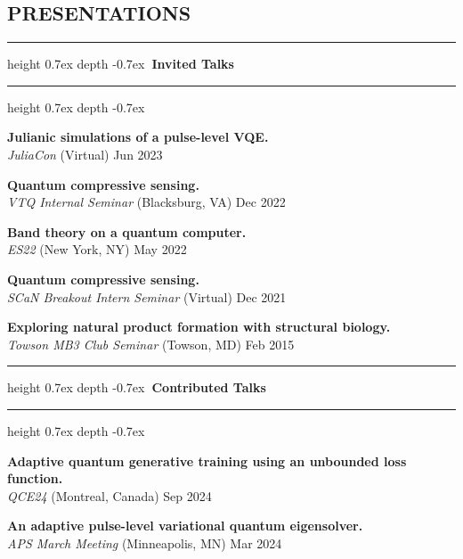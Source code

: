 \documentclass[marginmode, 10pt]{res} %
\def\Vhrulefill{\leavevmode\leaders\hrule height 0.7ex depth \dimexpr0.4pt-0.7ex\hfill\kern0pt}         %
\begin{document}
\begin{resume}

\pagebreak

\section{\small{PRESENTATIONS}}

\Vhrulefill \textbf{~Invited Talks~} \Vhrulefill

\textbf{Julianic simulations of a pulse-level VQE.} \\
    \textit{JuliaCon} (Virtual) \hfill Jun 2023

\textbf{Quantum compressive sensing.} \\
    \textit{VTQ Internal Seminar} (Blacksburg, VA) \hfill Dec 2022

\textbf{Band theory on a quantum computer.} \\
    \textit{ES22} (New York, NY) \hfill May 2022

\textbf{Quantum compressive sensing.} \\
    \textit{SCaN Breakout Intern Seminar} (Virtual) \hfill Dec 2021

\textbf{Exploring natural product formation with structural biology.} \\
    \textit{Towson MB3 Club Seminar} (Towson, MD) \hfill Feb 2015



\Vhrulefill \textbf{~Contributed Talks~} \Vhrulefill

\textbf{Adaptive quantum generative training using an unbounded loss function.} \\
    \textit{QCE24} (Montreal, Canada) \hfill Sep 2024

\textbf{An adaptive pulse-level variational quantum eigensolver.} \\
    \textit{APS March Meeting} (Minneapolis, MN) \hfill Mar 2024


\end{resume}
\end{document}
